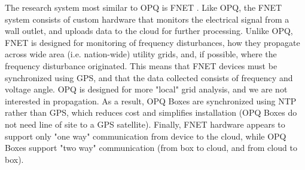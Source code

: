 The research system most similar to OPQ is FNET \cite{liu_distribution_2017}. Like OPQ, the FNET system consists of custom hardware that monitors the electrical signal from a wall outlet, and uploads data to the cloud for further processing. Unlike OPQ, FNET is designed for monitoring of frequency disturbances, how they propagate across wide area (i.e. nation-wide) utility grids, and, if possible, where the frequency disturbance originated. This means that FNET devices must be synchronized using GPS, and that the data collected consists of frequency and voltage angle. OPQ is designed for more "local" grid analysis, and we are not interested in propagation. As a result, OPQ Boxes are synchronized using NTP rather than GPS, which reduces cost and simplifies installation (OPQ Boxes do not need line of site to a GPS satellite). Finally, FNET hardware appears to support only "one way" communication from device to the cloud, while OPQ Boxes support "two way" communication (from box to cloud, and from cloud to box).
